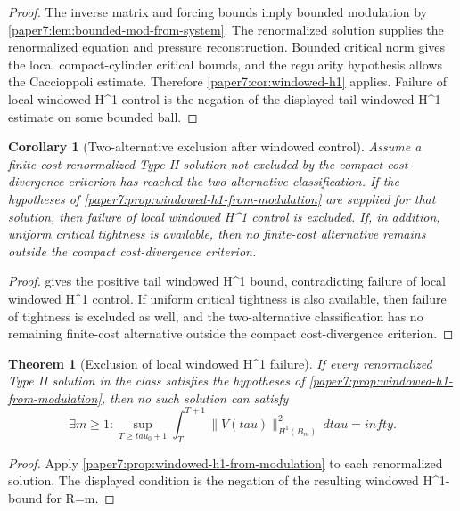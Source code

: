 \documentclass[11pt]{amsart}
\def\({}%
\def\){}%
\def\tau{tau}%
\def\infty{infty}%
\theoremstyle{plain}
\newtheorem{theorem}{Theorem}[section]
\newtheorem{corollary}[corollary]{Corollary}
\theoremstyle{definition}
\theoremstyle{remark}
\begin{document}
\begin{proof}
The inverse matrix and forcing bounds imply bounded modulation by
\cref{paper7:lem:bounded-mod-from-system}.  The renormalized solution supplies the
renormalized equation and pressure reconstruction.  Bounded critical norm
gives the local compact-cylinder critical bounds, and the regularity hypothesis
allows the Caccioppoli estimate.  Therefore
\cref{paper7:cor:windowed-h1} applies.  Failure of local windowed \(H^1\)
control is the negation of the displayed tail windowed \(H^1\) estimate on
some bounded ball.
\end{proof}

\begin{corollary}[Two-alternative exclusion after windowed control]\label{paper7:cor:windowed-control-update}
Assume a finite-cost renormalized Type II solution not excluded by the compact
cost-divergence criterion has reached the two-alternative classification.  If
the hypotheses of \cref{paper7:prop:windowed-h1-from-modulation} are supplied for that
solution, then failure of local windowed \(H^1\) control is excluded.  If, in
addition, uniform critical tightness is available, then no finite-cost
alternative remains outside the compact cost-divergence criterion.
\end{corollary}

\begin{proof}
 gives the positive tail windowed
\(H^1\) bound, contradicting failure of local windowed \(H^1\) control.  If
uniform critical tightness is also available, then failure of tightness is
excluded as well,
and the two-alternative classification has no remaining finite-cost alternative
outside the compact cost-divergence criterion.
\end{proof}

\begin{theorem}[Exclusion of local windowed \(H^1\) failure]\label{paper7:thm:windowed-h1-failure-exclusion}
If every renormalized Type II solution in the class satisfies the hypotheses of
\cref{paper7:prop:windowed-h1-from-modulation}, then no such solution can satisfy
\[
  \exists m\ge1:
  \sup_{T\ge\tau_0+1}
  \int_T^{T+1}\|V(\tau)\|_{H^1(B_m)}^2\,d\tau=\infty.
\]
\end{theorem}

\begin{proof}
Apply \cref{paper7:prop:windowed-h1-from-modulation} to each renormalized solution.  The
displayed condition is the negation of the resulting windowed
\(H^1\)-bound for \(R=m\).
\end{proof}
\end{document}

